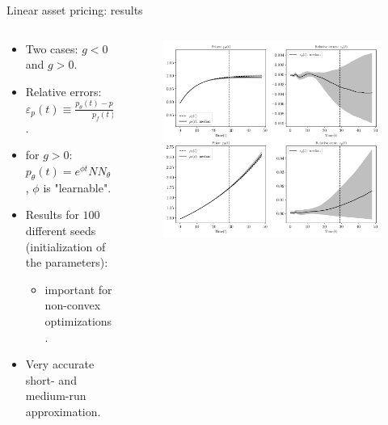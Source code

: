 \documentclass[aspectratio=169,10pt]{beamer}
\begin{document}
\begin{frame}{Linear asset pricing: results}
	\begin{columns}
		\begin{column}{0.5\textwidth}
			\begin{itemize}
				\item Two cases: $g<0$ and $g>0$.
				\vspace{0.05in}
				\item Relative errors: $\varepsilon_p(t)\equiv \frac{p_\theta(t)-p_f(t)}{p_f(t)}$.
				\vspace{0.05in}
				\item for $g>0$: $p_\theta(t) = e^{\phi t}
			 NN_\theta(t)$, $\phi$ is "learnable".
			 	\vspace{0.05in}
				\item Results for $100$ different seeds (initialization of the parameters):
				\begin{itemize}
					\item important for non-convex optimizations.
				\end{itemize} 
				\vspace{0.05in}
				\item Very accurate short- and medium-run approximation.
			\end{itemize}
		\end{column}
		\begin{column}{0.5\textwidth}
			\begin{figure}[t!]
				\centering
				\includegraphics[width=\textwidth]{figs/asset_pricing_sequential_combined.pdf}
				\vspace{-7mm}
			\end{figure}
		\end{column}
	\end{columns}
\end{frame}
\end{document}

